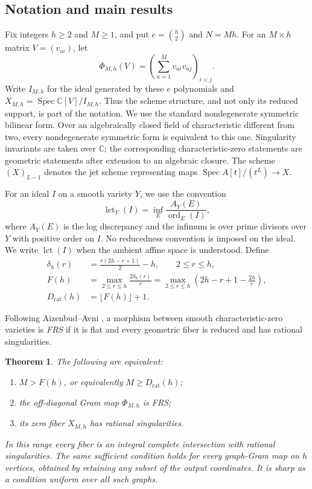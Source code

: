 \documentclass[11pt]{article}
\numberwithin{equation}{section}
\newtheorem{theorem}{Theorem}[section]
\theoremstyle{remark}
\newcommand{\C}{\mathbb C}
\newcommand{\lct}{\operatorname{lct}}
\newcommand{\Spec}{\operatorname{Spec}}
\newcommand{\Drat}{D_{\mathrm{rat}}}
\begin{document}
\subsection{Notation and main results}
Fix integers $h\ge2$ and $M\ge1$, and put $e=\binom h2$ and $N=Mh$.
For an $M\times h$ matrix $V=(v_{ai})$, let
\[
 \Phi_{M,h}(V)=\left(\sum_{a=1}^M v_{ai}v_{aj}\right)_{i<j}.
\]
Write $I_{M,h}$ for the ideal generated by these $e$ polynomials and
$X_{M,h}=\Spec\C[V]/I_{M,h}$. Thus the scheme structure, and not only
its reduced support, is part of the notation.
We use the standard nondegenerate symmetric bilinear form. Over an
algebraically closed field of characteristic different from two, every
nondegenerate symmetric form is equivalent to this one. Singularity
invariants are taken over $\C$; the corresponding characteristic-zero
statements are geometric statements after extension to an algebraic
closure. The scheme $(X)_{L-1}$ denotes the jet scheme representing maps
$\operatorname{Spec} A[t]/(t^L)\to X$.

For an ideal $I$ on a smooth variety $Y$, we use the convention
\[
 \lct_Y(I)=\inf_E\frac{A_Y(E)}{\operatorname{ord}_E(I)},
\]
where $A_Y(E)$ is the log discrepancy and the infimum is over prime
divisors over $Y$ with positive order on $I$. No reducedness convention
is imposed on the ideal. We write $\lct(I)$ when the ambient affine
space is understood.
Define
\begin{align}
 \delta_h(r)&=\frac{r(2h-r+1)}2-h,\qquad 2\le r\le h, \label{eq:delta}\\
 F(h)&=\max_{2\le r\le h}\frac{2\delta_h(r)}r
      =\max_{2\le r\le h}\left(2h-r+1-\frac{2h}{r}\right),\label{eq:F}\\
 \Drat(h)&=\lfloor F(h)\rfloor+1.\label{eq:Drat}
\end{align}

Following Aizenbud--Avni \cite{AAfrs}, a morphism between smooth
characteristic-zero varieties is \emph{FRS} if it is flat and every
geometric fiber is reduced and has rational singularities.

\begin{theorem}\label{thm:rat}
The following are equivalent:
\begin{enumerate}
\item $M>F(h)$, or equivalently $M\ge\Drat(h)$;
\item the off-diagonal Gram map $\Phi_{M,h}$ is FRS;
\item its zero fiber $X_{M,h}$ has rational singularities.
\end{enumerate}
In this range every fiber is an integral complete intersection with
rational singularities. The same sufficient condition holds for every
 graph-Gram map on $h$ vertices, obtained by retaining any subset of
 the output coordinates. It is sharp as a condition uniform over all
 such graphs.
\end{theorem}
\end{document}
